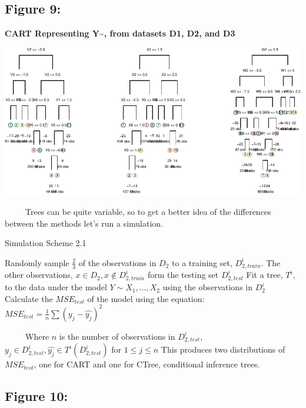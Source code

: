 \documentclass[12pt,twoside]{reedthesis}
\begin{document}
  \subsection{Figure 9:}\label{figure-9}
  
  \textbf{CART Representing Y\textasciitilde{}, from datasets D1, D2, and
  D3}
  
  \begin{center}\includegraphics{Thesis_files/figure-latex/fig9-1} \end{center}
  
  ~~~~~Trees can be quite variable, so to get a better idea of the
  differences between the methods let's run a simulation.
  
  \begin{algorithm}
  \caption{Simulation Scheme 2.1}
  \label{sim2.1}
  \begin{algorithmic}[1]
  \State Randomly sample $\frac 2 3$  of the observations in  $D_2$  to a training set,  $D_{2, train}^i$. The other observations,  $x \in D_2, x \notin D_{2, train}^i$ form the testing set $D_{2, test}^i$
  \State Fit a tree, $T^i$, to the data under the model $Y \sim X_1,...,X_2$ using the observations in      $D_{2}^i$
  \State Calculate the $MSE_{test}$ of the model using the equation:
      $MSE_{test} = \frac 1 n \sum (y_j - \hat{y_j})^2$
  \EndFor
  \end{algorithmic}
  \end{algorithm}
  
  ~~~~~Where \(n\) is the number of observations in \(D_{2, test}^i\),
  \(y_j \in D_{2, test}^i, \hat{y_j} \in T^i(D_{2, test}^i)\) for
  \(1 \leq j \leq n\) This produces two distributions of \(MSE_{test}\),
  one for CART and one for CTree, conditional inference trees.
  
  \subsection{Figure 10:}\label{figure-10}
  
\end{document}
